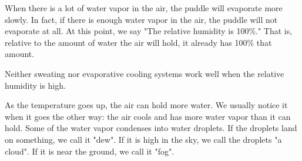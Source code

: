 When there is a lot of water vapor in the air, the puddle will evaporate more slowly.  In fact, if there is enough
water vapor in the air, the puddle will not evaporate at all.  At this point, we say "The relative humidity is 100\%."  That is, relative to the amount of water the air will hold, it already has 100\% that amount.

Neither sweating nor evaporative cooling systems work well when the relative humidity is high.

As the temperature goes up, the air can hold more water. We usually notice it when it goes the other way: the air cools and has more water vapor than it can hold. Some of the water vapor condenses into water droplets. If the droplets land on something, we call it "dew". If it is high in the sky, we call the droplets "a cloud". If it is near the ground, we call it "fog".



 
